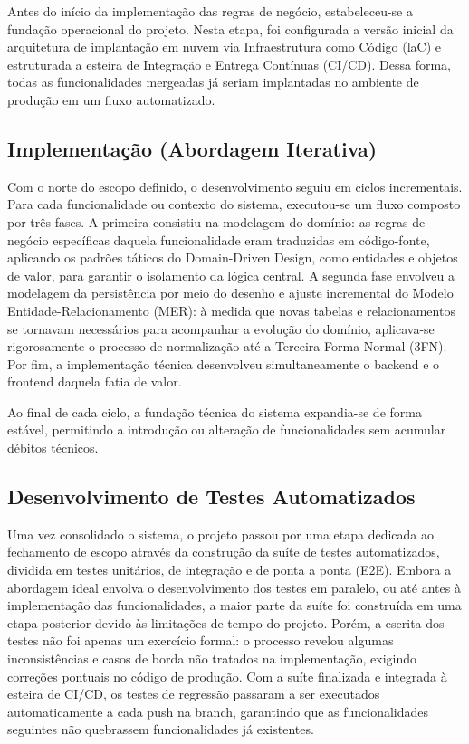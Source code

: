 \documentclass[article,a4paper,12pt,brazil,sumario=tradicional]{abntex2}
\begin{document}
Antes do início da implementação das regras de negócio, estabeleceu-se a fundação operacional do projeto. Nesta etapa, foi configurada a versão inicial da arquitetura de implantação em nuvem via Infraestrutura como Código (laC) e estruturada a esteira de Integração e Entrega Contínuas (CI/CD). Dessa forma, todas as funcionalidades mergeadas já seriam implantadas no ambiente de produção em um fluxo automatizado.

\subsection{Implementação (Abordagem Iterativa)}

Com o norte do escopo definido, o desenvolvimento seguiu em ciclos incrementais. Para cada funcionalidade ou contexto do sistema, executou-se um fluxo composto por três fases. A primeira consistiu na modelagem do domínio: as regras de negócio específicas daquela funcionalidade eram traduzidas em código-fonte, aplicando os padrões táticos do Domain-Driven Design, como entidades e objetos de valor, para garantir o isolamento da lógica central. A segunda fase envolveu a modelagem da persistência por meio do desenho e ajuste incremental do Modelo Entidade-Relacionamento (MER): à medida que novas tabelas e relacionamentos se tornavam necessários para acompanhar a evolução do domínio, aplicava-se rigorosamente o processo de normalização até a Terceira Forma Normal (3FN). Por fim, a implementação técnica desenvolveu simultaneamente o backend e o frontend daquela fatia de valor.

Ao final de cada ciclo, a fundação técnica do sistema expandia-se de forma estável, permitindo a introdução ou alteração de funcionalidades sem acumular débitos técnicos.

\subsection{Desenvolvimento de Testes Automatizados}

Uma vez consolidado o sistema, o projeto passou por uma etapa dedicada ao fechamento de escopo através da construção da suíte de testes automatizados, dividida em testes unitários, de integração e de ponta a ponta (E2E). Embora a abordagem ideal envolva o desenvolvimento dos testes em paralelo, ou até antes à implementação das funcionalidades, a maior parte da suíte foi construída em uma etapa posterior devido às limitações de tempo do projeto. Porém, a escrita dos testes não foi apenas um exercício formal: o processo revelou algumas inconsistências e casos de borda não tratados na implementação, exigindo correções pontuais no código de produção. Com a suíte finalizada e integrada à esteira de CI/CD, os testes de regressão passaram a ser executados automaticamente a cada push na branch, garantindo que as funcionalidades seguintes não quebrassem funcionalidades já existentes.
\end{document}
